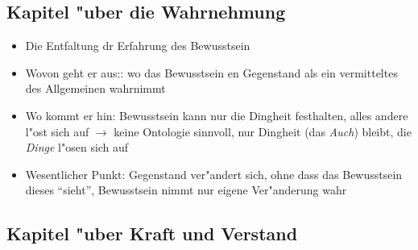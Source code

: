 \documentclass[emulatestandardclasses]{scrartcl}
\begin{document}
\subsection{Kapitel "uber die Wahrnehmung}

\begin{itemize}
  \item Die Entfaltung dr Erfahrung des Bewusstsein
  \item Wovon geht er aus:: wo das Bewusstsein en Gegenstand als ein vermitteltes des Allgemeinen wahrnimmt
  \item Wo kommt er hin: Bewusstsein kann nur die Dingheit festhalten, alles andere l"ost sich auf $\rightarrow$ keine Ontologie sinnvoll, nur Dingheit (das \emph{Auch}) bleibt, die \emph{Dinge} l"osen sich auf
  \item Wesentlicher Punkt: Gegenstand ver"andert sich, ohne dass das Bewusstsein dieses "`sieht"', Bewusstsein nimmt nur eigene Ver"anderung wahr
\end{itemize}

\subsection{Kapitel "uber Kraft und Verstand}
\end{document}
